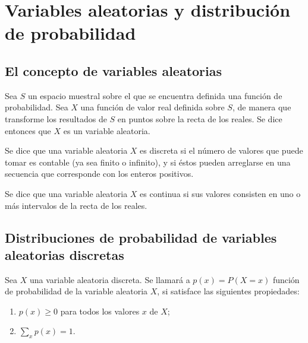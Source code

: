 \chapter{Variables aleatorias y distribución de probabilidad}

\section{El concepto de variables aleatorias}

\begin{tcolorbox}[colframe=white]
    \begin{def.} Sea $S$ un espacio muestral sobre el que se encuentra definida una función de probabilidad. Sea $X$ una función de valor real definida sobre $S$, de manera que transforme los resultados de $S$ en puntos sobre la recta de los reales. Se dice entonces que $X$ es un variable aleatoria.
	\end{def.}
\end{tcolorbox}

\begin{tcolorbox}[colframe=white]
	\begin{def.} Se dice que una variable aleatoria $X$ es discreta si el número de valores que puede tomar es contable (ya sea finito o infinito), y si éstos pueden arreglarse en una secuencia que corresponde con los enteros positivos.
	\end{def.}
\end{tcolorbox}
\begin{tcolorbox}[colframe=white]
    	\begin{def.} Se dice que una variable aleatoria $X$ es continua si sus valores consisten en uno o más intervalos de la recta de los reales.
	\end{def.}
\end{tcolorbox}

\section{Distribuciones de  probabilidad de variables aleatorias discretas}

\begin{tcolorbox}[colframe=white]
    \begin{def.} Sea $X$ una variable aleatoria discreta. Se llamará a $p(x) = P(X=x)$ función de probabilidad de la variable aleatoria $X$, si satisface las siguientes propiedades:
	\begin{enumerate}[\bfseries 1.]
	    \item $p(x)\geq 0$  para todos los valores $x$ de $X$;
	    \item $\sum\limits_x p(x)=1.$
	\end{enumerate}
	\end{def.}
\end{tcolorbox}


